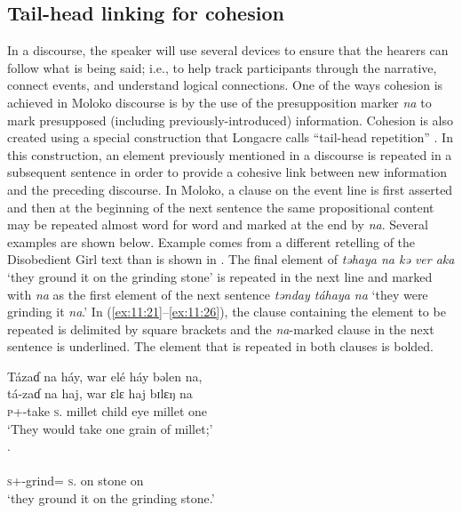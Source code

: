 \subsection{Tail-head linking for cohesion}\label{sec:11.1.3}
\hypertarget{RefHeading1213221525720847}{}
In a discourse, the speaker will use several devices to ensure that the hearers can follow what is being said; i.e., to help track participants through the narrative, connect events, and understand logical connections. One of the ways cohesion is achieved in Moloko discourse is by the use of the presupposition marker \textit{na} to mark presupposed (including previously-introduced) information. Cohesion is also created using a special construction that Longacre calls “tail-head repetition” \citep[204]{Longacre1976}. In this construction, an element previously mentioned in a discourse is repeated in a subsequent sentence in order to provide a cohesive link between new information and the preceding discourse. In Moloko, a clause on the event line is first asserted and then at the beginning of the next sentence the same propositional content may be repeated almost word for word and marked at the end by \textit{na}. Several examples are shown below. Example  comes from a different retelling of the Disobedient Girl text than is shown in . The final element of \textit{təhaya na kə ver aka} ‘they ground it on the grinding stone’ is repeated in the next line and marked with \textit{na} as the first element of the next sentence \textit{tənday táhaya na} ‘they were grinding it \textit{na}.’ In (\ref{ex:11:21}--\ref{ex:11:26}), the clause containing the element to be repeated is delimited by square brackets and the \textit{na}{}-marked clause in the next sentence is underlined. The element that is repeated in both clauses is bolded. 

\ea \label{ex:11:21}
Tázaɗ  na  háy,  war  elé  háy  bəlen  na,\\  
\gll  tá-zaɗ  na  haj,  war ɛlɛ   haj  bɪlɛŋ  na \\       
      \textsc{p}+{\IFV}-take  \textsc{s}.{\DO}  millet  child  eye   millet  one {\PSP} \\         
\glt ‘They would take one grain of millet;’\\

.\\  
\gll [\textbf{t\'ə-h}\textbf{=aja}  na kə  vɛr  aka] \\
     \textsc{s}+{\IFV}-grind={\PLU}   \textsc{s}.{\DO} on stone  on\\
\glt ‘they ground it on the grinding stone.’\\

